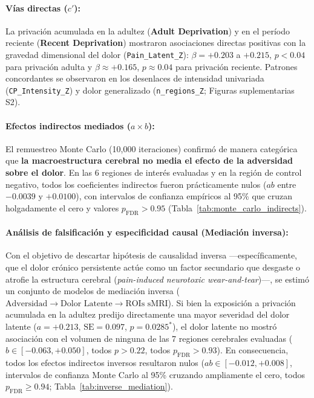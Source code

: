 \documentclass[11pt,a4paper]{article}
\begin{document}
\paragraph{Vías directas ($c'$):}La privación acumulada en la adultez (\textbf{Adult Deprivation}) y en el período reciente (\textbf{Recent Deprivation}) mostraron asociaciones directas positivas con la gravedad
dimensional del dolor (\texttt{Pain\_Latent\_Z}): $\beta = +0.203$ a $+0.215$, $p < 0.04$ para privación adulta y $\beta \approx +0.165$, $p \approx 0.04$  para privación reciente. Patrones concordantes se observaron 
en los desenlaces de intensidad univariada (\texttt{CP\_Intensity\_Z}) y dolor generalizado (\texttt{n\_regions\_Z}; Figuras suplementarias S2).

\paragraph{Efectos indirectos mediados ($a \times b$):}El remuestreo Monte Carlo (10,000 iteraciones) confirmó de manera categórica que \textbf{la macroestructura cerebral no media el efecto de la adversidad sobre el dolor}.
En las 6 regiones de interés evaluadas y en la región de control negativo, todos los coeficientes indirectos fueron prácticamente nulos ($ab$ entre $-0.0039$ y $+0.0100$), con intervalos de confianza empíricos al 95\% que
cruzan holgadamente el cero y valores $p_{\text{FDR}} > 0.95$ (Tabla~\ref{tab:monte_carlo_indirects}).

\paragraph{Análisis de falsificación y especificidad causal (Mediación inversa):}
Con el objetivo de descartar hipótesis de causalidad inversa —específicamente, que el dolor crónico persistente actúe como un factor secundario que desgaste o atrofie la estructura cerebral (\textit{pain-induced neurotoxic wear-and-tear})—, 
se estimó un conjunto de modelos de mediación inversa ($\text{Adversidad} \to \text{Dolor Latente} \to \text{ROIs sMRI}$). Si bien la exposición a privación acumulada en la adultez predijo directamente una mayor severidad del dolor latente 
($a = +0.213$, $\text{SE} = 0.097$, $p = 0.0285^*$), el dolor latente no mostró asociación con el volumen de ninguna de las 7 regiones cerebrales evaluadas ($b \in [-0.063, +0.050]$, todos $p > 0.22$, todos $p_{\text{FDR}} > 0.93$). 
En consecuencia, todos los efectos indirectos inversos resultaron nulos ($ab \in [-0.012, +0.008]$, intervalos de confianza Monte Carlo al 95\% cruzando ampliamente el cero, todos $p_{\text{FDR}} \ge 0.94$; Tabla~\ref{tab:inverse_mediation}). 
\end{document}
